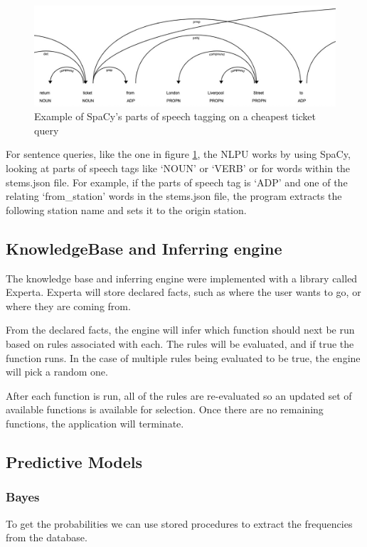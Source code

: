 \documentclass[11pt]{article}
\begin{document}
	\begin{figure}[!htb]
		\begin{center}
			\includegraphics[width=1\textwidth]{Resources/partsOfSpeechLarge.jpeg}
			\caption{Example of SpaCy's parts of speech tagging on a cheapest ticket query}
			\label{Img:Spacy}
		\end{center}
	\end{figure}

	For sentence queries, like the one in figure \ref{Img:Spacy}, the NLPU works by using SpaCy, looking at parts of speech tags like `NOUN' or `VERB' or for words within the stems.json file. For example, if the parts of speech tag is `ADP' and one of the relating `from\_station' words in the stems.json file, the program extracts the following station name and sets it to the origin station.

	\subsection{KnowledgeBase and Inferring engine}
	The knowledge base and inferring engine were implemented with a library called Experta. Experta will store declared facts, such as where the user wants to go, or where they are coming from.

	From the declared facts, the engine will infer which function should next be run based on rules associated with each. The rules will be evaluated, and if true the function runs. In the case of multiple rules being evaluated to be true, the engine will pick a random one.

	After each function is run, all of the rules are re-evaluated so an updated set of available functions is available for selection. Once there are no remaining functions, the application will terminate.

	\subsection{Predictive Models}

	\subsubsection{Bayes}
	To get the probabilities we can use stored procedures to extract the frequencies from the database.
\end{document}
